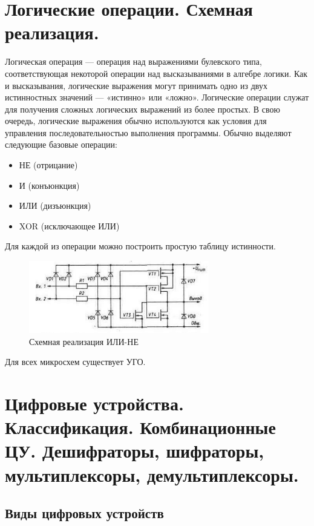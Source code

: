 \documentclass[unicode, 12pt, a4paper, oneside]{article}
\begin{document}
\section{Логические операции. Схемная реализация.}

Логическая операция — операция над выражениями булевского типа, соответствующая некоторой операции над высказываниями в алгебре логики. Как и высказывания, логические выражения могут принимать одно из двух истинностных значений — «истинно» или «ложно». Логические операции служат для получения сложных логических выражений из более простых. В свою очередь, логические выражения обычно используются как условия для управления последовательностью выполнения программы.
Обычно выделяют следующие базовые операции:
\begin{itemize}
\item НЕ (отрицание)
\item И (конъюнкция)
\item ИЛИ (дизъюнкция)
\item XOR (исключающее ИЛИ)
\end{itemize}
Для каждой из операции можно построить простую таблицу истинности.

\begin{figure}[H]
\centering
\includegraphics[width=0.7\textwidth]{10_or_not.png}
\caption{Схемная реализация ИЛИ-НЕ}
\label{fig:10_or_not}
\end{figure}
Для всех микросхем существует УГО.


\section{Цифровые устройства. Классификация. Комбинационные ЦУ. Дешифраторы, шифраторы, мультиплексоры, демультиплексоры.}

\subsection*{Виды цифровых устройств}
\end{document}
